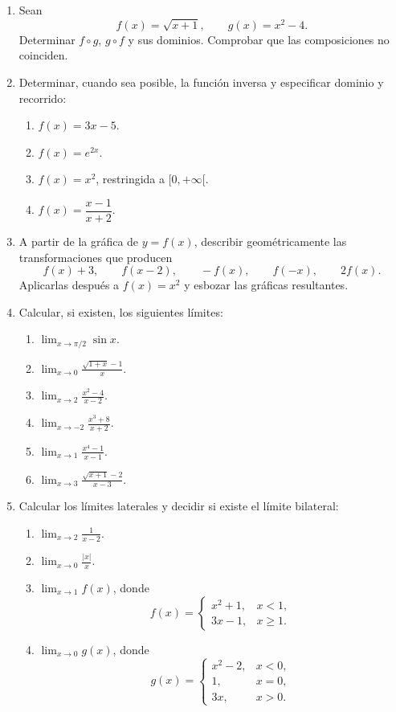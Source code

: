 \begin{enumerate}[label=\textbf{\arabic*.},leftmargin=*]
\item Sean
\[
f(x)=\sqrt{x+1},\qquad g(x)=x^2-4.
\]
Determinar $f\circ g$, $g\circ f$ y sus dominios. Comprobar que las composiciones no coinciden.

\item Determinar, cuando sea posible, la función inversa y especificar dominio y recorrido:
\begin{enumerate}[label=\alph*)]
\item $f(x)=3x-5$.
\item $f(x)=e^{2x}$.
\item $f(x)=x^2$, restringida a $[0,+\infty[$.
\item $f(x)=\dfrac{x-1}{x+2}$.
\end{enumerate}

\item A partir de la gráfica de $y=f(x)$, describir geométricamente las transformaciones que producen
\[
f(x)+3,
\qquad f(x-2),
\qquad -f(x),
\qquad f(-x),
\qquad 2f(x).
\]
Aplicarlas después a $f(x)=x^2$ y esbozar las gráficas resultantes.

\item Calcular, si existen, los siguientes límites:
\begin{enumerate}[label=\alph*)]
\item $\displaystyle\lim_{x\to\pi/2}\sin x$.
\item $\displaystyle\lim_{x\to0}\frac{\sqrt{1+x}-1}{x}$.
\item $\displaystyle\lim_{x\to2}\frac{x^2-4}{x-2}$.
\item $\displaystyle\lim_{x\to-2}\frac{x^3+8}{x+2}$.
\item $\displaystyle\lim_{x\to1}\frac{x^4-1}{x-1}$.
\item $\displaystyle\lim_{x\to3}\frac{\sqrt{x+1}-2}{x-3}$.
\end{enumerate}

\item Calcular los límites laterales y decidir si existe el límite bilateral:
\begin{enumerate}[label=\alph*)]
\item $\displaystyle\lim_{x\to2}\frac{1}{x-2}$.
\item $\displaystyle\lim_{x\to0}\frac{|x|}{x}$.
\item $\displaystyle\lim_{x\to1}f(x)$, donde
\[
f(x)=\begin{cases}
x^2+1,&x<1,\\3x-1,&x\geq1.
\end{cases}
\]
\item $\displaystyle\lim_{x\to0}g(x)$, donde
\[
g(x)=\begin{cases}
x^2-2,&x<0,\\1,&x=0,\\3x,&x>0.
\end{cases}
\]
\end{enumerate}


\end{enumerate}

